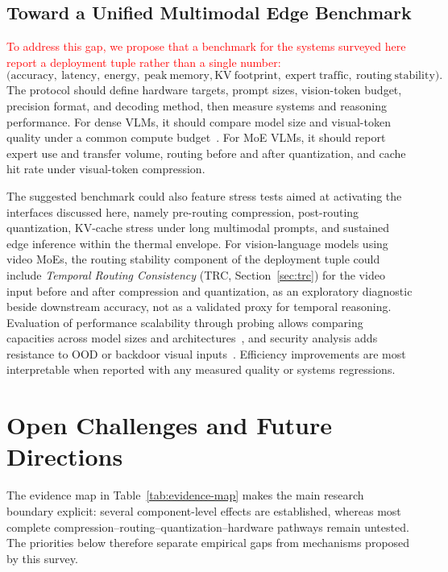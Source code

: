 \documentclass[10pt]{article}
\begin{document}
\subsection{Toward a Unified Multimodal Edge Benchmark}

\textcolor{red}{To address this gap, we propose that a benchmark for the systems
surveyed here report a deployment tuple rather than a single number:}
\[
\big(
\mathrm{accuracy},\ \mathrm{latency},\ \mathrm{energy},\ \mathrm{peak\ memory},
\mathrm{KV\ footprint},\ \mathrm{expert\ traffic},\ \mathrm{routing\ stability}
\big).
\]
The protocol should define hardware targets, prompt sizes, vision-token budget,
precision format, and decoding method, then measure systems and reasoning performance.
For dense VLMs, it should compare model size and visual-token quality under a common
compute budget~\citep{li2025inferenceoptimalvlmsneed}.  For MoE VLMs, it should report
expert use and transfer volume, routing before and after quantization, and cache hit rate
under visual-token compression.

The suggested benchmark could also feature stress tests aimed at activating the
interfaces discussed here, namely pre-routing compression, post-routing quantization,
KV-cache stress under long multimodal prompts, and sustained edge inference within the
thermal envelope.  For vision-language models using video MoEs, the routing stability component of
the deployment tuple could include \emph{Temporal Routing Consistency}
(TRC, Section~\ref{sec:trc}) for the video input before and after compression and quantization,
as an exploratory diagnostic beside downstream accuracy, not as a validated proxy for
temporal reasoning.  Evaluation of performance scalability through probing allows comparing
capacities across model sizes and architectures~\citep{castro2023scalableperformanceanalysisvisionlanguage},
and security analysis adds resistance to OOD or backdoor visual inputs~\citep{lyu2025backdooringvisionlanguagemodelsoutofdistribution}.
Efficiency improvements are most interpretable when reported with any measured quality
or systems regressions.

\section{Open Challenges and Future Directions}
\label{sec:challenges}

The evidence map in Table~\ref{tab:evidence-map} makes the main research boundary
explicit: several component-level effects are established, whereas most complete
compression--routing--quantization--hardware pathways remain untested.  The priorities
below therefore separate empirical gaps from mechanisms proposed by this survey.
\end{document}
